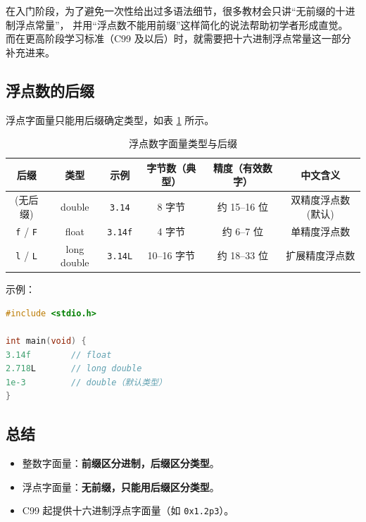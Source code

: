 在入门阶段，为了避免一次性给出过多语法细节，很多教材会只讲“无前缀的十进制浮点常量”，
并用“浮点数不能用前缀”这样简化的说法帮助初学者形成直觉。  
而在更高阶段学习标准（C99 及以后）时，就需要把十六进制浮点常量这一部分补充进来。

\subsection{浮点数的后缀}%

浮点字面量只能用后缀确定类型，如表 \ref{tab:float-suffix} 所示。

\begin{table}[h]
\centering
\caption{浮点数字面量类型与后缀}\label{tab:float-suffix}
\begin{tabular}{cccccc}
\hline
后缀 & 类型 & 示例 & 字节数（典型） & 精度（有效数字） & 中文含义 \\ \hline

(无后缀) & double & \verb|3.14| 
& 8 字节
& 约 15–16 位 
& 双精度浮点数(默认) \\

\verb|f| / \verb|F| & float & \verb|3.14f| 
& 4 字节
& 约 6–7 位 
& 单精度浮点数 \\

\verb|l| / \verb|L| & long double & \verb|3.14L| 
& 10–16 字节
& 约 18–33 位 
& 扩展精度浮点数 \\

\hline
\end{tabular}
\end{table}


示例：



\begin{lstlisting}[language=C,caption={浮点数后缀示例},label={code:float-suffix}]
#include <stdio.h>

int main(void) {
3.14f        // float
2.718L       // long double
1e-3         // double（默认类型）
}
\end{lstlisting}


\subsection{总结}

\begin{itemize}
    \item 整数字面量：\textbf{前缀区分进制，后缀区分类型}。
    \item 浮点字面量：\textbf{无前缀，只能用后缀区分类型}。
    \item C99 起提供十六进制浮点字面量（如 \verb|0x1.2p3|）。
\end{itemize}






























